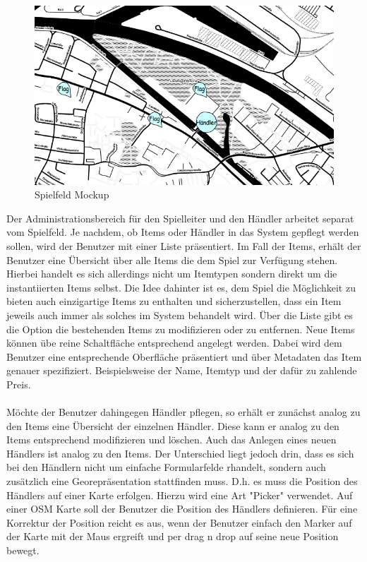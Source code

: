\begin{figure}[H]
\begin{center}
\includegraphics[width=140mm]{images/ch5_img05_dialog.png}
\caption{Spielfeld Mockup}
\label{img:ch5_img05_dialog}
\end{center}
\end{figure}

Der Administrationsbereich für den Spielleiter und den Händler arbeitet separat vom Spielfeld.
Je nachdem, ob Items oder Händler in das System gepflegt werden sollen, wird der Benutzer mit einer Liste präsentiert.
Im Fall der Items, erhält der Benutzer eine Übersicht über alle Items die dem Spiel zur Verfügung stehen. Hierbei handelt es sich allerdings nicht um Itemtypen sondern direkt um die instantiierten Items selbst. Die Idee dahinter ist es, dem Spiel die Möglichkeit zu bieten auch einzigartige Items zu enthalten und sicherzustellen, dass ein Item jeweils auch immer als solches im System behandelt wird. Über die Liste gibt es die Option die bestehenden Items zu modifizieren oder zu entfernen. Neue Items können übe reine Schaltfläche entsprechend angelegt werden. Dabei wird dem Benutzer eine entsprechende Oberfläche präsentiert und über Metadaten das Item genauer spezifiziert. Beispielsweise der Name, Itemtyp und der dafür  zu zahlende Preis.
\\\\
Möchte der Benutzer dahingegen Händler pflegen, so erhält er zunächst analog zu den Items eine Übersicht der einzelnen Händler.
Diese kann er analog zu den Items entsprechend modifizieren und löschen. Auch das Anlegen eines neuen Händlers ist analog zu den Items. Der Unterschied liegt jedoch drin, dass es sich bei den Händlern nicht um einfache Formularfelde rhandelt, sondern auch zusätzlich eine Georepräsentation stattfinden muss. D.h. es muss die Position des Händlers auf einer Karte erfolgen. Hierzu wird eine Art "Picker" verwendet. Auf einer OSM Karte soll der Benutzer die Position des Händlers definieren. Für eine Korrektur der Position reicht es aus, wenn der Benutzer einfach den Marker auf der Karte mit der Maus ergreift und per drag n drop auf seine neue Position bewegt.


